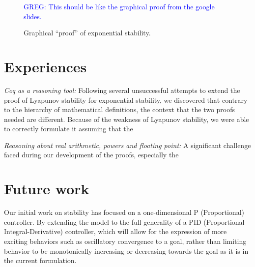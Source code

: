 \documentclass[preprint]{sigplanconf}
\newcommand{\greg}[1]{\textcolor{blue}{\textsc{GREG}: #1}}
\begin{document}



\begin{figure}

\greg{This should be like the graphical proof from the google slides.}

\caption{Graphical ``proof'' of exponential stability.}
\label{fig:graphical-proof}
\end{figure}

\section {Experiences}

\emph{Coq as a reasoning tool: } Following several unsuccessful attempts to extend the proof of Lyapunov stability for exponential stability, we discovered that contrary to the hierarchy of mathematical definitions, the context that the two proofs needed are different. Because of the weakness of Lyapunov stability, we were able to correctly formulate it assuming that the






\emph{Reasoning about real arithmetic, powers and floating point: }
A significant challenge faced during our development of the proofs, especially the

\section{Future work}

Our initial work on stability has focused on a one-dimensional P (Proportional) controller. By extending the model to the full generality of a PID (Proportional-Integral-Derivative) controller, which will allow for the expression of more exciting behaviors such as oscillatory convergence to a goal, rather than limiting behavior to be monotonically increasing or decreasing towards the goal as it is in the current formulation.
\end{document}
